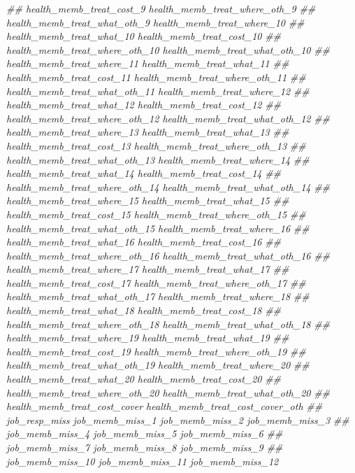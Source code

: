 \documentclass[
]{article}
\newenvironment{Shaded}{\begin{snugshade}}{\end{snugshade}}
\newcommand{\CommentTok}[1]{\textcolor[rgb]{0.56,0.35,0.01}{\textit{#1}}}
\begin{document}
\begin{Shaded}
\begin{Highlighting}[]
\CommentTok{##      health_memb_treat_cost_9 health_memb_treat_where_oth_9}
\CommentTok{##      health_memb_treat_what_oth_9 health_memb_treat_where_10}
\CommentTok{##      health_memb_treat_what_10 health_memb_treat_cost_10}
\CommentTok{##      health_memb_treat_where_oth_10 health_memb_treat_what_oth_10}
\CommentTok{##      health_memb_treat_where_11 health_memb_treat_what_11}
\CommentTok{##      health_memb_treat_cost_11 health_memb_treat_where_oth_11}
\CommentTok{##      health_memb_treat_what_oth_11 health_memb_treat_where_12}
\CommentTok{##      health_memb_treat_what_12 health_memb_treat_cost_12}
\CommentTok{##      health_memb_treat_where_oth_12 health_memb_treat_what_oth_12}
\CommentTok{##      health_memb_treat_where_13 health_memb_treat_what_13}
\CommentTok{##      health_memb_treat_cost_13 health_memb_treat_where_oth_13}
\CommentTok{##      health_memb_treat_what_oth_13 health_memb_treat_where_14}
\CommentTok{##      health_memb_treat_what_14 health_memb_treat_cost_14}
\CommentTok{##      health_memb_treat_where_oth_14 health_memb_treat_what_oth_14}
\CommentTok{##      health_memb_treat_where_15 health_memb_treat_what_15}
\CommentTok{##      health_memb_treat_cost_15 health_memb_treat_where_oth_15}
\CommentTok{##      health_memb_treat_what_oth_15 health_memb_treat_where_16}
\CommentTok{##      health_memb_treat_what_16 health_memb_treat_cost_16}
\CommentTok{##      health_memb_treat_where_oth_16 health_memb_treat_what_oth_16}
\CommentTok{##      health_memb_treat_where_17 health_memb_treat_what_17}
\CommentTok{##      health_memb_treat_cost_17 health_memb_treat_where_oth_17}
\CommentTok{##      health_memb_treat_what_oth_17 health_memb_treat_where_18}
\CommentTok{##      health_memb_treat_what_18 health_memb_treat_cost_18}
\CommentTok{##      health_memb_treat_where_oth_18 health_memb_treat_what_oth_18}
\CommentTok{##      health_memb_treat_where_19 health_memb_treat_what_19}
\CommentTok{##      health_memb_treat_cost_19 health_memb_treat_where_oth_19}
\CommentTok{##      health_memb_treat_what_oth_19 health_memb_treat_where_20}
\CommentTok{##      health_memb_treat_what_20 health_memb_treat_cost_20}
\CommentTok{##      health_memb_treat_where_oth_20 health_memb_treat_what_oth_20}
\CommentTok{##      health_memb_treat_cost_cover health_memb_treat_cost_cover_oth}
\CommentTok{##      job_resp_miss job_memb_miss_1 job_memb_miss_2 job_memb_miss_3}
\CommentTok{##      job_memb_miss_4 job_memb_miss_5 job_memb_miss_6}
\CommentTok{##      job_memb_miss_7 job_memb_miss_8 job_memb_miss_9}
\CommentTok{##      job_memb_miss_10 job_memb_miss_11 job_memb_miss_12}

\end{Highlighting}
\end{Shaded}
\end{document}
